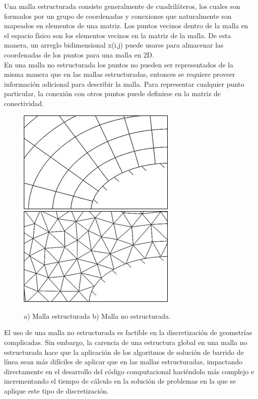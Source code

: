 \documentclass[11pt,letterpaper]{article}
\begin{document}
 



Una malla estructurada consiste generalmente de cuadriláteros, los cuales son formados por un grupo de coordenadas y conexiones que naturalmente son mapeados en elementos de una matriz. Los puntos vecinos dentro de la malla en el espacio físico son los elementos vecinos en la matriz de la malla. De esta manera, un arreglo bidimensional x(i,j) puede usarse para almacenar las coordenadas de los puntos para una malla en 2D.\\

En una malla no estructurada los puntos no pueden ser representados de la misma manera que en las mallas estructuradas, entonces se requiere proveer información adicional para describir la malla. Para representar cualquier punto particular, la conexión con otros puntos puede definirse en la matriz de conectividad.

\begin{figure}[H]
	\centering
	\includegraphics[scale=0.5]{./imgs/mallaEstructurada.jpg}
	\includegraphics[scale=0.519]{./imgs/mallaNoEstructurada.jpg}
	\caption{a) Malla estructurada b) Malla no estructurada.}
\end{figure}


El uso de una malla no estructurada es factible en la discretización de geometrías complicadas. Sin embargo, la carencia de una estructura global en una malla no estructurada hace que la aplicación de los algoritmos de solución de barrido de línea sean más difíciles de aplicar que en las mallas estructuradas, impactando directamente en el desarrollo del código computacional haciéndolo más complejo e incrementando el tiempo de cálculo en la solución de problemas en la que se aplique este tipo de discretización.\\
\end{document}
